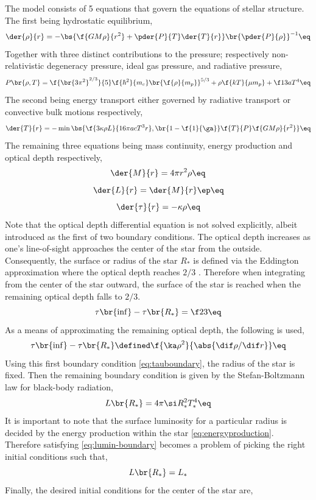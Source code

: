 \documentclass[11pt]{article}
\begin{document}
    The model consists of 5 equations that govern the equations of stellar structure. The first being hydrostatic equilibrium,
    \[ \der{\rho}{r} = - \bs{\f{GM\rho}{r^2} + \pder{P}{T}\der{T}{r}} \br{\pder{P}{\rho}}^{-1} \eq\label{eq:hydrostaticequilibrium} \]
    Together with three distinct contributions to the pressure; respectively non-relativistic degeneracy pressure, ideal gas pressure, and radiative pressure,
    \[ P\br{\rho, T} = \f{\br{3\pi^2}^{2/3}}{5}\f{\hbar^2}{m_e}\br{\f{\rho}{m_p}}^{5/3} + \rho \f{kT}{\mu m_p} + \f13 a T^4 \eq \label{eq:partialpressures} \]
    The second being energy transport either governed by radiative transport or convective bulk motions respectively,
    \[ \der{T}{r} = - \min \bs{\f{3\kappa \rho L}{16 \pi a c T^3 r}, \br{1 - \f{1}{\ga}}\f{T}{P}\f{GM\rho}{r^2}} \eq \label{eq:energytransport} \]
    The remaining three equations being mass continuity, energy production and optical depth respectively,
    \[ \der{M}{r} = 4 \pi r^2 \rho \eq \label{eq:masscontinuity} \]
    \[ \der{L}{r} = \der{M}{r} \ep \eq \label{eq:energyproduction} \]
    \[ \der{\tau}{r} = - \kappa \rho \eq \label{eq:opticaldepth} \]
    Note that the optical depth differential equation is not solved explicitly, albeit introduced as the first of two boundary conditions. The optical depth increases as one's line-of-sight approaches the center of the star from the outside. Consequently, the surface or radius of the star $R_*$ is defined via the Eddington approximation where the optical depth reaches $2/3$ \cite{eddington}. Therefore when integrating from the center of the star outward, the surface of the star is reached when the remaining optical depth falls to $2/3$.
    \[ \tau\br{\inf} - \tau\br{R_*} = \f23 \eq \label{eq:tauboundary} \]
    As a means of approximating the remaining optical depth, the following is used,
    \[ \tau\br{\inf} - \tau\br{R_*} \defined \f{\ka \rho^2}{\abs{\dif \rho / \dif r}} \eq \label{eq:tauproxy} \]
    Using this first boundary condition \eqref{eq:tauboundary}, the radius of the star is fixed. Then the remaining boundary condition is given by the Stefan-Boltzmann law for black-body radiation,
    \[ L\br{R_*} = 4 \pi \si R_*^2 T_*^4 \eq \label{eq:lumin-boundary}\]
    It is important to note that the surface luminosity for a particular radius is decided by the energy production within the star \eqref{eq:energyproduction}. Therefore satisfying \eqref{eq:lumin-boundary} becomes a problem of picking the right initial conditions such that,
    \[ L\br{R_*} = L_* \]
    Finally, the desired initial conditions for the center of the star are,
\end{document}
